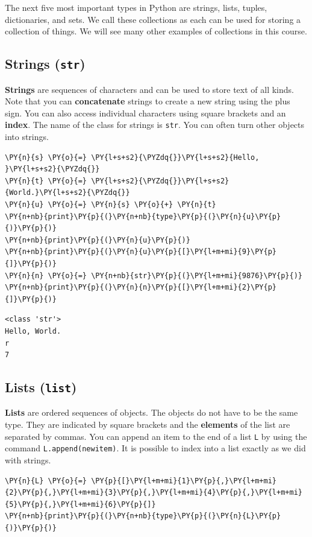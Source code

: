 The next five most important types in Python are strings, lists, tuples, dictionaries, and sets.  We call these collections as each can be used for storing a collection of things.  We will see many other examples of collections in this course.

\subsection{Strings  (\texttt{str})}


\textbf{Strings} are sequences of characters and can be used to store text of all kinds.  Note that you can \textbf{concatenate} strings to create a new string using the plus sign.  You can also access individual characters using square brackets and an \textbf{index}.  The name of the class for strings is \texttt{str}.  You can often turn other objects into strings.


\begin{Verbatim}[commandchars=\\\{\}]
\PY{n}{s} \PY{o}{=} \PY{l+s+s2}{\PYZdq{}}\PY{l+s+s2}{Hello, }\PY{l+s+s2}{\PYZdq{}}
\PY{n}{t} \PY{o}{=} \PY{l+s+s2}{\PYZdq{}}\PY{l+s+s2}{World.}\PY{l+s+s2}{\PYZdq{}}
\PY{n}{u} \PY{o}{=} \PY{n}{s} \PY{o}{+} \PY{n}{t}
\PY{n+nb}{print}\PY{p}{(}\PY{n+nb}{type}\PY{p}{(}\PY{n}{u}\PY{p}{)}\PY{p}{)}
\PY{n+nb}{print}\PY{p}{(}\PY{n}{u}\PY{p}{)}
\PY{n+nb}{print}\PY{p}{(}\PY{n}{u}\PY{p}{[}\PY{l+m+mi}{9}\PY{p}{]}\PY{p}{)}
\PY{n}{n} \PY{o}{=} \PY{n+nb}{str}\PY{p}{(}\PY{l+m+mi}{9876}\PY{p}{)}
\PY{n+nb}{print}\PY{p}{(}\PY{n}{n}\PY{p}{[}\PY{l+m+mi}{2}\PY{p}{]}\PY{p}{)}
\end{Verbatim}

\begin{Verbatim}
<class 'str'>
Hello, World.
r
7

\end{Verbatim}

\subsection{Lists (\texttt{list})}


\textbf{Lists} are ordered sequences of objects.  The objects do not have to be the same type.  They are indicated by square brackets and the \textbf{elements} of the list are separated by commas.  You can append an item to the end of a list \texttt{L} by using the command \texttt{L.append(newitem)}.
It is possible to index into a list exactly as we did with strings.


\begin{Verbatim}[commandchars=\\\{\}]
\PY{n}{L} \PY{o}{=} \PY{p}{[}\PY{l+m+mi}{1}\PY{p}{,}\PY{l+m+mi}{2}\PY{p}{,}\PY{l+m+mi}{3}\PY{p}{,}\PY{l+m+mi}{4}\PY{p}{,}\PY{l+m+mi}{5}\PY{p}{,}\PY{l+m+mi}{6}\PY{p}{]}
\PY{n+nb}{print}\PY{p}{(}\PY{n+nb}{type}\PY{p}{(}\PY{n}{L}\PY{p}{)}\PY{p}{)}
\end{Verbatim}


